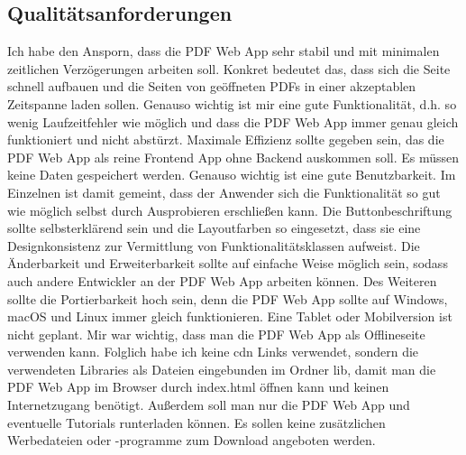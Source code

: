 \subsection{Qualitätsanforderungen}
Ich habe den Ansporn, dass die PDF Web App sehr stabil und mit minimalen zeitlichen Verzögerungen arbeiten soll. Konkret bedeutet das, dass sich die Seite schnell aufbauen und die Seiten von geöffneten PDFs in einer akzeptablen Zeitspanne laden sollen. Genauso wichtig ist mir eine gute Funktionalität, d.h. so wenig Laufzeitfehler wie möglich und dass die PDF Web App immer genau gleich funktioniert und nicht abstürzt. Maximale Effizienz sollte gegeben sein, das die PDF Web App als reine Frontend App ohne Backend auskommen soll. Es müssen keine Daten gespeichert werden. Genauso wichtig ist eine gute Benutzbarkeit. Im Einzelnen ist damit gemeint, dass der Anwender sich die Funktionalität so gut wie möglich selbst durch Ausprobieren erschließen kann. Die Buttonbeschriftung sollte selbsterklärend sein und die Layoutfarben so eingesetzt, dass sie eine Designkonsistenz zur Vermittlung von Funktionalitätsklassen aufweist. Die Änderbarkeit und Erweiterbarkeit sollte auf einfache Weise möglich sein, sodass auch andere Entwickler an der PDF Web App arbeiten können. Des Weiteren sollte die Portierbarkeit hoch sein, denn die PDF Web App sollte auf Windows, macOS und Linux immer gleich funktionieren. Eine Tablet oder Mobilversion ist nicht geplant. Mir war wichtig, dass man die PDF Web App als Offlineseite verwenden kann. Folglich habe ich keine \gls{cdn} Links verwendet, sondern die verwendeten Libraries als Dateien eingebunden im Ordner lib, damit man die PDF Web App im Browser durch index.html öffnen kann und keinen Internetzugang benötigt. Außerdem soll man nur die PDF Web App und eventuelle Tutorials runterladen können. Es sollen keine zusätzlichen Werbedateien oder -programme zum Download angeboten werden.